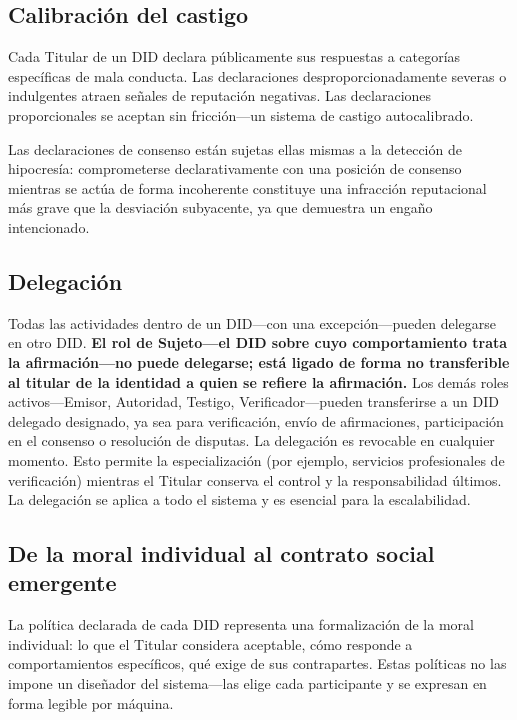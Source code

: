 \documentclass[11pt,a4paper,twocolumn]{article}
\begin{document}
\subsection{Calibración del castigo}

Cada Titular de un DID declara públicamente sus respuestas a categorías específicas de mala conducta. Las declaraciones desproporcionadamente severas o indulgentes atraen señales de reputación negativas. Las declaraciones proporcionales se aceptan sin fricción---un sistema de castigo autocalibrado.

Las declaraciones de consenso están sujetas ellas mismas a la detección de hipocresía: comprometerse declarativamente con una posición de consenso mientras se actúa de forma incoherente constituye una infracción reputacional más grave que la desviación subyacente, ya que demuestra un engaño intencionado.

\subsection{Delegación}

Todas las actividades dentro de un DID---con una excepción---pueden delegarse en otro DID. \textbf{El rol de Sujeto---el DID sobre cuyo comportamiento trata la afirmación---no puede delegarse; está ligado de forma no transferible al titular de la identidad a quien se refiere la afirmación.} Los demás roles activos---Emisor, Autoridad, Testigo, Verificador---pueden transferirse a un DID delegado designado, ya sea para verificación, envío de afirmaciones, participación en el consenso o resolución de disputas. La delegación es revocable en cualquier momento. Esto permite la especialización (por ejemplo, servicios profesionales de verificación) mientras el Titular conserva el control y la responsabilidad últimos. La delegación se aplica a todo el sistema y es esencial para la escalabilidad.

\subsection{De la moral individual al contrato social emergente}

La política declarada de cada DID representa una formalización de la moral individual: lo que el Titular considera aceptable, cómo responde a comportamientos específicos, qué exige de sus contrapartes. Estas políticas no las impone un diseñador del sistema---las elige cada participante y se expresan en forma legible por máquina.
\end{document}
